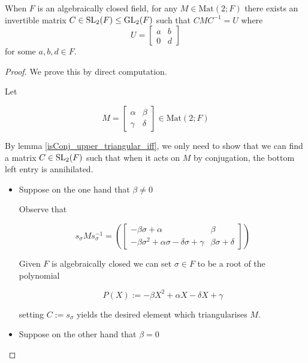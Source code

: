 \begin{lemma}
\label{isTriangularizable_of_algClosed}
\leanok
    When $F$ is an algebraically closed field, 
    for any $M \in \textrm{Mat}(2; F)$ there exists an invertible matrix $C \in \operatorname{SL}_2(F) \le \operatorname{GL}_2(F)$ such that $C M C^{-1} = U$ where
    \[
    U = \begin{bmatrix}
        a & b\\
        0 & d
    \end{bmatrix}\] for some $a, b, d \in F$.
\end{lemma}
\begin{proof}
    \leanok
We prove this by direct computation. 

Let 

\[
M = \begin{bmatrix}
\alpha & \beta\\
\gamma & \delta
\end{bmatrix} \in\textrm{Mat}(2; F)
\]

By lemma \ref{isConj_upper_triangular_iff}, we only need to show that we can find a matrix $C \in \operatorname{SL}_2(F)$ such that when it acts on $M$ by conjugation, the bottom left entry is annihilated.

\begin{itemize}
    \item Suppose on the one hand that $\beta \ne 0$
    
    Observe that 
    
    \begin{equation}\label{triang}
        s_\sigma M s_\sigma^{-1} = \left(\begin{bmatrix}
            -\beta \sigma + \alpha & \beta \\
            -\beta \sigma^{2} + \alpha \sigma - \delta \sigma + \gamma & \beta \sigma + \delta
            \end{bmatrix}\right)
    \end{equation}

    Given $F$ is algebraically closed we can set $\sigma \in F$ to be a root of the polynomial

    \[
    P(X) := -\beta X^{2} + \alpha X - \delta X + \gamma 
    \]

    setting $C := s_\sigma$ yields the desired element which triangularises $M$.
    

    \item Suppose on the other hand that $\beta = 0$
    

\end{itemize}
\end{proof}
